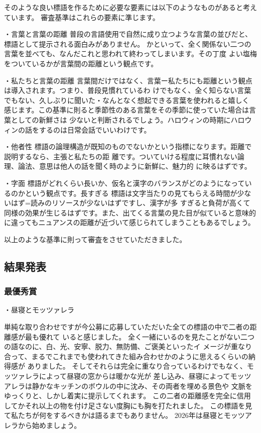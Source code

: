 そのような良い標語を作るために必要な要素には以下のようなものがあると考えています。
審査基準はこれらの要素に準じます。

・言葉と言葉の距離
普段の言語使用で自然に成り立つような言葉の並びだと、標語として提示される面白みがありません。
かといって、全く関係ない二つの言葉を並べても、なんだこれと思われて終わってしまいます。その丁度
よい塩梅をついているかが言葉間の距離という観点です。

・私たちと言葉の距離
言葉間だけではなく、言葉ー私たちにも距離という観点は導入されます。つまり、普段見慣れているわ
けでもなく、全く知らない言葉でもない、久しぶりに聞いた・なんとなく想起できる言葉を使われると嬉しく
感じます。この基準に則ると季節性のある言葉をその季節に使っていた場合は言葉としての新鮮さは
少ないと判断されるでしょう。ハロウィンの時期にハロウィンの話をするのは日常会話でいいわけです。

・他者性
標語の論理構造が既知のものでないかという指標になります。距離で説明するなら、主張と私たちの距
離です。ついていける程度に耳慣れない論理、論法、意思は他人の話を聞く時のように新鮮に、魅力的
に映るはずです。

・字面
標語がどれくらい長いか、仮名と漢字のバランスがどのようになっているのかという観点です。長すぎる
標語は文字当たりの見てもらえる時間が少ないはず=読みのリソースが少ないはずですし、漢字が多
すぎると負荷が高くて同様の効果が生じるはずです。また、出てくる言葉の見た目が似ていると意味的
に違ってもニュアンスの距離が近づいて感じられてしまうこともあるでしょう。

以上のような基準に則って審査をさせていただきました。

\subsection{結果発表}

\subsubsection{最優秀賞}

・昼寝とモッツァレラ

単純な取り合わせですが今公募に応募していただいた全ての標語の中で二者の距離感が最も優れて
いると感じました。
全く一緒にいるのを見たことがない二つの語なのに、白、光、安寧、脱力、無防備、ご褒美といったイ
メージが重なり合って、まるでこれまでも使われてきた組み合わせかのように思えるくらいの納得感が
ありました。
そしてそれらは完全に重なり合っているわけでもなく、モッツァレラによって昼寝の窓からは暖かな光が
差し込み、昼寝によってモッツアレラは静かなキッチンのボウルの中に沈み、その両者を埋める景色や
文脈をゆっくりと、しかし着実に提示してくれます。
この二者の距離感を完全に信用してかそれ以上の物を付け足さない度胸にも胸を打たれました。
この標語を見て私たちが何をするべきかは語るまでもありません。
2026年は昼寝とモッツアレラから始めましょう。

